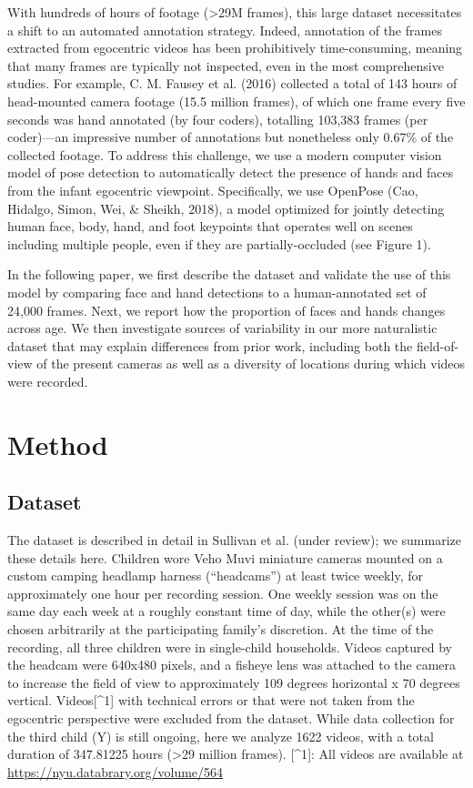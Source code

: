 \documentclass[10pt, letterpaper]{article}
\begin{document}
With hundreds of hours of footage (\textgreater{}29M frames), this large
dataset necessitates a shift to an automated annotation strategy.
Indeed, annotation of the frames extracted from egocentric videos has
been prohibitively time-consuming, meaning that many frames are
typically not inspected, even in the most comprehensive studies. For
example, C. M. Fausey et al. (2016) collected a total of 143 hours of
head-mounted camera footage (15.5 million frames), of which one frame
every five seconds was hand annotated (by four coders), totalling
103,383 frames (per coder)---an impressive number of annotations but
nonetheless only 0.67\% of the collected footage. To address this
challenge, we use a modern computer vision model of pose detection to
automatically detect the presence of hands and faces from the infant
egocentric viewpoint. Specifically, we use OpenPose (Cao, Hidalgo,
Simon, Wei, \& Sheikh, 2018), a model optimized for jointly detecting
human face, body, hand, and foot keypoints that operates well on scenes
including multiple people, even if they are partially-occluded (see
Figure 1).

In the following paper, we first describe the dataset and validate the
use of this model by comparing face and hand detections to a
human-annotated set of 24,000 frames. Next, we report how the proportion
of faces and hands changes across age. We then investigate sources of
variability in our more naturalistic dataset that may explain
differences from prior work, including both the field-of-view of the
present cameras as well as a diversity of locations during which videos
were recorded.

\section{Method}\label{method}

\subsection{Dataset}\label{dataset}

The dataset is described in detail in Sullivan et al. (under review); we
summarize these details here. Children wore Veho Muvi miniature cameras
mounted on a custom camping headlamp harness (``headcams'') at least
twice weekly, for approximately one hour per recording session. One
weekly session was on the same day each week at a roughly constant time
of day, while the other(s) were chosen arbitrarily at the participating
family's discretion. At the time of the recording, all three children
were in single-child households. Videos captured by the headcam were
640x480 pixels, and a fisheye lens was attached to the camera to
increase the field of view to approximately 109 degrees horizontal x 70
degrees vertical. Videos{[}\^{}1{]} with technical errors or that were
not taken from the egocentric perspective were excluded from the
dataset. While data collection for the third child (Y) is still ongoing,
here we analyze 1622 videos, with a total duration of 347.81225 hours
(\textgreater{}29 million frames). {[}\^{}1{]}: All videos are available
at \url{https://nyu.databrary.org/volume/564}
\end{document}
